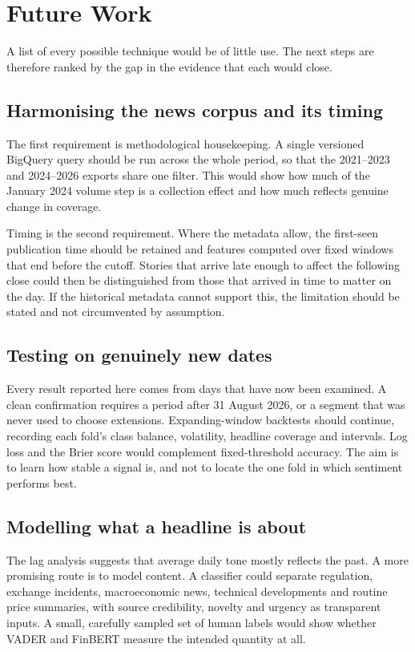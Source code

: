 \section{Future Work}
\label{ch:future}
A list of every possible technique would be of little use. The next steps are therefore ranked by the gap in the evidence that each would close.

\subsection{Harmonising the news corpus and its timing}
The first requirement is methodological housekeeping. A single versioned BigQuery query should be run across the whole period, so that the 2021--2023 and 2024--2026 exports share one filter. This would show how much of the January 2024 volume step is a collection effect and how much reflects genuine change in coverage.

Timing is the second requirement. Where the metadata allow, the first-seen publication time should be retained and features computed over fixed windows that end before the cutoff. Stories that arrive late enough to affect the following close could then be distinguished from those that arrived in time to matter on the day. If the historical metadata cannot support this, the limitation should be stated and not circumvented by assumption.

\subsection{Testing on genuinely new dates}
Every result reported here comes from days that have now been examined. A clean confirmation requires a period after 31 August 2026, or a segment that was never used to choose extensions. Expanding-window backtests should continue, recording each fold's class balance, volatility, headline coverage and intervals. Log loss and the Brier score \cite{brier1950} would complement fixed-threshold accuracy. The aim is to learn how stable a signal is, and not to locate the one fold in which sentiment performs best.

\subsection{Modelling what a headline is about}
The lag analysis suggests that average daily tone mostly reflects the past. A more promising route is to model content. A classifier could separate regulation, exchange incidents, macroeconomic news, technical developments and routine price summaries, with source credibility, novelty and urgency as transparent inputs. A small, carefully sampled set of human labels would show whether VADER and FinBERT measure the intended quantity at all.


